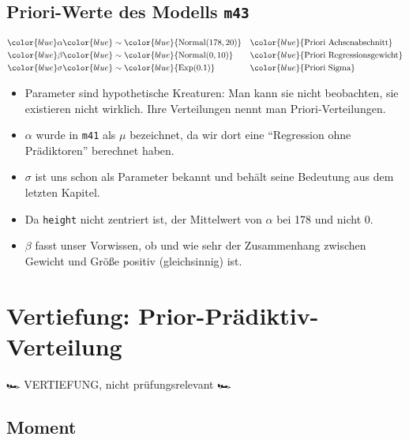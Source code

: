 \documentclass[
  a4paper,
  DIV=11]{scrreprt}
\providecommand{\tightlist}{%
  \setlength{\itemsep}{0pt}\setlength{\parskip}{0pt}}\usepackage{longtable,booktabs,array}
\theoremstyle{definition}
\theoremstyle{remark}
\begin{document}
\hypertarget{priori-werte-des-modells-m43}{%
\subsection{\texorpdfstring{Priori-Werte des Modells
\texttt{m43}}{Priori-Werte des Modells m43}}\label{priori-werte-des-modells-m43}}

\begin{align*}
\color{blue}\alpha & \color{blue}\sim \color{blue}{\operatorname{Normal}(178, 20)} && \color{blue}{\text{Priori Achsenabschnitt}} \\
\color{blue}\beta  & \color{blue}\sim \color{blue}{\operatorname{Normal}(0, 10)}  && \color{blue}{\text{Priori Regressionsgewicht}}\\
\color{blue}\sigma & \color{blue}\sim \color{blue}{\operatorname{Exp}(0.1)}  && \color{blue}{\text{Priori Sigma}}
\end{align*}

\begin{itemize}
\tightlist
\item
  Parameter sind hypothetische Kreaturen: Man kann sie nicht beobachten,
  sie existieren nicht wirklich. Ihre Verteilungen nennt man
  Priori-Verteilungen.
\item
  \(\alpha\) wurde in \texttt{m41} als \(\mu\) bezeichnet, da wir dort
  eine ``Regression ohne Prädiktoren'' berechnet haben.
\item
  \(\sigma\) ist uns schon als Parameter bekannt und behält seine
  Bedeutung aus dem letzten Kapitel.
\item
  Da \texttt{height} nicht zentriert ist, der Mittelwert von \(\alpha\)
  bei 178 und nicht 0.
\item
  \(\beta\) fasst unser Vorwissen, ob und wie sehr der Zusammenhang
  zwischen Gewicht und Größe positiv (gleichsinnig) ist.
\end{itemize}

\hypertarget{vertiefung-prior-pruxe4diktiv-verteilung}{%
\section{Vertiefung:
Prior-Prädiktiv-Verteilung}\label{vertiefung-prior-pruxe4diktiv-verteilung}}

🏎️ VERTIEFUNG, nicht prüfungsrelevant 🏎️

\hypertarget{moment}{%
\subsection{Moment}\label{moment}}
\end{document}
